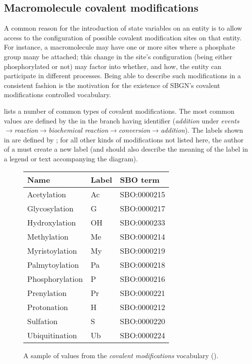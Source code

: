 \subsection{Macromolecule covalent modifications}
\label{sec:covalent-mod-cv}

A common reason for the introduction of state variables on an entity is to allow access to the configuration of possible covalent modification sites on that entity.  For instance, a macromolecule may have one or more sites where a phosphate group many be attached; this change in the site's configuration (\ie being either phosphorylated or not) may factor into whether, and how, the entity can participate in different processes.  Being able to describe such modifications in a consistent fashion is the motivation for the existence of SBGN's covalent modifications controlled vocabulary.  

 lists a number of common types of covalent modifications.  The most common values are defined by the \sbo in the branch having identifier  (\emph{addition} under \emph{events}$\rightarrow$\emph{reaction}$\rightarrow$\emph{biochemical reaction}$\rightarrow$\emph{conversion}$\rightarrow$\emph{addition}).  The labels shown in  are defined by \SBGNPDLone; for all other kinds of modifications not listed here, the author of a \PD must create a new label (and should also describe the meaning of the label in a legend or text accompanying the diagram).

\begin{figure}[h]
  \centering
  \begin{tabular}{l>{\ttfamily}ll}
    \toprule
    \textbf{Name}   & \textbf{\rmfamily Label} & \textbf{SBO term} \\
    \midrule
    Acetylation     & Ac    & SBO:0000215\\
    Glycosylation   & G     & SBO:0000217\\
    Hydroxylation   & OH    & SBO:0000233\\
    Methylation     & Me    & SBO:0000214\\
    Myristoylation  & My    & SBO:0000219\\
    Palmytoylation  & Pa    & SBO:0000218\\
    Phosphorylation & P     & SBO:0000216\\
    Prenylation     & Pr    & SBO:0000221\\
    Protonation     & H     & SBO:0000212\\
    Sulfation       & S     & SBO:0000220\\
    Ubiquitination  & Ub    & SBO:0000224\\
    \bottomrule
  \end{tabular}
  \caption{A sample of values from the \emph{covalent modifications} vocabulary
    ().}
  \label{fig:covalent-mod-cv}
\end{figure}


